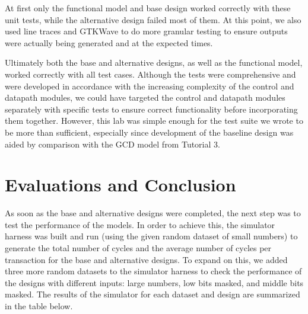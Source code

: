 \documentclass[10pt]{article}
\begin{document}
At first only the functional model and base design worked correctly with these unit tests, while the alternative design failed most of them. At this point, we also used line traces and GTKWave to do more granular testing to ensure outputs were actually being generated and at the expected times. 

Ultimately both the base and alternative designs, as well as the functional model, worked correctly with all test cases. Although the tests were comprehensive and were developed in accordance with the increasing complexity of the control and datapath modules, we could have targeted the control and datapath modules separately with specific tests to ensure correct functionality before incorporating them together. However, this lab was simple enough for the test suite we wrote to be more than sufficient, especially since development of the baseline design was aided by comparison with the GCD model from Tutorial 3. 


\section{Evaluations and Conclusion}

As soon as the base and alternative designs were completed, the next step was to test the performance of the models. In order to achieve this, the simulator harness was built and run (using the given random dataset of small numbers) to generate the total number of cycles and the average number of cycles per transaction for the base and alternative designs. To expand on this, we added three more random datasets to the simulator harness to check the performance of the designs with different inputs: large numbers, low bits masked, and middle bits masked. The results of the simulator for each dataset and design are summarized in the table below.
\end{document}
